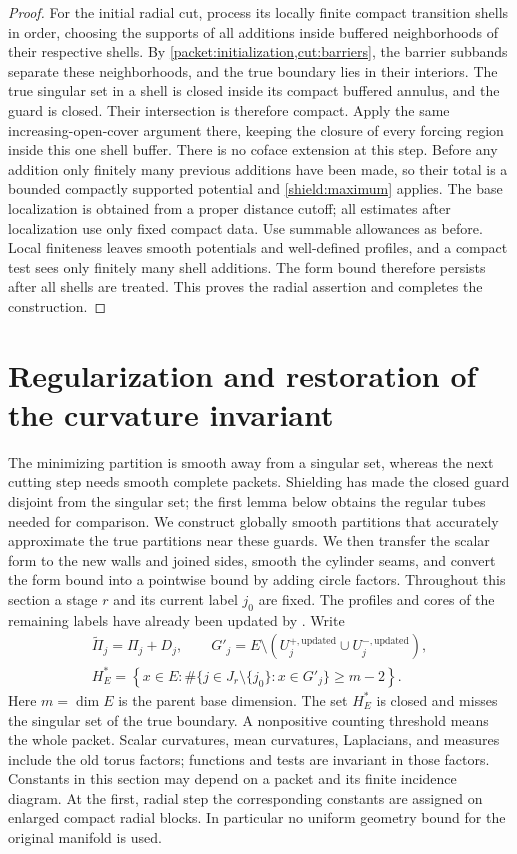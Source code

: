 \documentclass[11pt]{article}
\numberwithin{equation}{section}
\theoremstyle{definition}
\theoremstyle{remark}
\begin{document}
\begin{proof}
For the initial radial cut, process its locally finite compact
transition shells in order, choosing the supports of all additions
inside buffered neighborhoods of their respective shells.
By \cref{packet:initialization,cut:barriers}, the barrier subbands
separate these neighborhoods, and the true boundary lies in
their interiors.  The true singular set in a shell is closed inside its compact buffered
annulus, and the guard is closed.  Their intersection is therefore
compact.  Apply the same increasing-open-cover argument there, keeping
the closure of every forcing region inside this one shell buffer.
There is no coface extension at this step.  Before any addition only
finitely many previous additions have
been made, so their total is a bounded compactly supported potential
and \cref{shield:maximum} applies.  The base localization is obtained
from a proper distance cutoff; all estimates after localization use
only fixed compact data.  Use summable allowances as before.  Local
finiteness leaves smooth potentials and well-defined profiles, and a
compact test sees only finitely many shell additions.  The form bound
therefore persists after all shells are treated.  This proves the
radial assertion and completes the construction.
\end{proof}

\section{Regularization and restoration of the curvature invariant}\label{sec:regularization}

The minimizing partition is smooth away from a singular set, whereas the
next cutting step needs smooth complete packets.  Shielding has made the
closed guard disjoint from the singular set; the first lemma below obtains
the regular tubes needed for comparison.  We construct globally smooth
partitions that accurately approximate the true partitions near these
guards.  We then transfer the scalar form to the new walls and joined
sides, smooth the cylinder seams, and convert the form bound into a
pointwise bound by adding circle factors.  Throughout this section a stage
$r$ and its current label $j_0$ are fixed.  The profiles and
cores of the remaining labels have already been updated by
.  Write
\[
\begin{gathered}
 \widetilde\Pi_j=\Pi_j+D_j,\qquad
 G'_j=E\setminus(U_j^{+,\mathrm{updated}}\cup U_j^{-,\mathrm{updated}}),\\
 H_E^*=\left\{x\in E:
       \#\{j\in J_r\setminus\{j_0\}:x\in G'_j\}\ge m-2\right\}.
\end{gathered}
\]
Here $m=\dim E$ is the parent base dimension.  The set $H_E^*$ is closed
and misses the singular set of the true boundary.  A nonpositive counting
threshold means the whole packet.  Scalar curvatures, mean curvatures,
Laplacians, and measures include the old torus factors; functions and tests
are invariant in those factors.  Constants in this section may depend on a
packet and its finite incidence diagram.  At the first, radial step the
corresponding constants are assigned on enlarged compact radial blocks.
In particular no uniform geometry bound for the original manifold is used.
\end{document}
